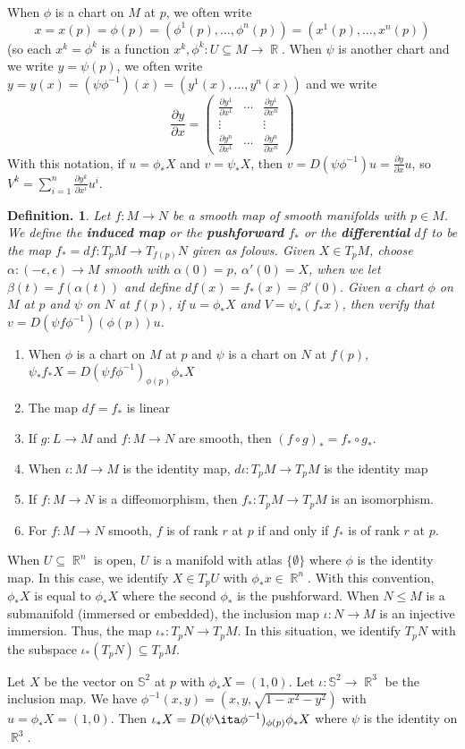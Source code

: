 \documentclass[11pt, a4paper]{memoir}
\DeclareMathOperator{\R}{{\mathbb{R}}}
\theoremstyle{change}
\theoremstyle{plain}
\theoremstyle{nonumberplain}
\newtheorem{definition}{Definition.}
\newcommand{\prt}[2]{\ensuremath{\frac{\partial #1}{\partial #2}}}
\numberwithin{equation}{section}
\begin{document}
When $\phi$ is a chart on $M$ at $p$, we often write
\begin{equation*}
    x=x(p)=\phi(p)=(\phi^1(p),\ldots,\phi^n(p))=(x^1(p),\ldots,x^n(p))
\end{equation*}
(so each $x^k=\phi^k$ is a function $x^k,\phi^k:U\subseteq M\to\R$.
When $\psi$ is another chart and we write $y=\psi(p)$, we often write $y=y(x)=(\psi\phi^{-1})(x)=(y^1(x),\ldots,y^n(x))$ and we write
\begin{equation*}
    \prt{y}{x}=
    \begin{pmatrix}
        \prt{y^1}{x^1} & \cdots & \prt{y^1}{x^n}\\
        \vdots &&\vdots\\
        \prt{y^n}{x^1} & \cdots & \prt{y^n}{x^n}
    \end{pmatrix}
\end{equation*}
With this notation, if $u=\phi_*X$ and $v=\psi_*X$, then $v=D(\psi\phi^{-1})u=\prt{y}{x}u$, so $V^k=\sum_{i=1}^n\prt{y^k}{x^i}u^i$.
\begin{definition}
    Let $f:M\to N$ be a smooth map of smooth manifolds with $p\in M$.
    We define the \textbf{induced map} or the \textbf{pushforward} $f_*$ or the \textbf{differential} $df$ to be the map $f_*=df:T_pM\to T_{f(p)}N$ given as folows.
    Given $X\in T_pM$, choose $\alpha:(-\epsilon,\epsilon)\to M$ smooth with $\alpha(0)=p$, $\alpha'(0)=X$, when we let $\beta(t)=f(\alpha(t))$ and define $df(x)=f_*(x)=\beta'(0)$.
    Given a chart $\phi$ on $M$ at $p$ and $\psi$ on $N$ at $f(p)$, if $u=\phi_*X$ and $V=\psi_*(f_*x)$, then verify that $v=D(\psi f\phi^{-1})(\phi(p))u$.
\end{definition}
\begin{enumerate}[nl]
    \item When $\phi$ is a chart on $M$ at $p$ and $\psi$ is a chart on $N$ at $f(p)$, $\psi_*f_*X=D(\psi f\phi^{-1})_{\phi(p)}\phi_*X$
    \item The map $df=f_*$ is linear
    \item If $g:L\to M$ and $f:M\to N$ are smooth, then $(f\circ g)_*=f_*\circ g_*$.
    \item When $\iota:M\to M$ is the identity map, $d\iota:T_pM\to T_pM$ is the identity map
    \item If $f:M\to N$ is a diffeomorphism, then $f_*:T_pM\to T_pM$ is an isomorphism.
    \item For $f:M\to N$ smooth, $f$ is of rank $r$ at $p$ if and only if $f_*$ is of rank $r$ at $p$.
\end{enumerate}
When $U\subseteq\R^n$ is open, $U$ is a manifold with atlas $\{\emptyset\}$ where $\phi$ is the identity map.
In this case, we identify $X\in T_pU$ with $\phi_*x\in\R^n$.
With this convention, $\phi_*X$ is equal to $\phi_*X$ where the second $\phi_*$ is the pushforward.
When $N\leq M$ is a submanifold (immersed or embedded), the inclusion map $\iota:N\to M$ is an injective immersion.
Thus, the map $\iota_*:T_pN\to T_pM$.
In this situation, we identify $T_pN$ with the subspace $\iota_*(T_pN)\subseteq T_pM$.

Let $X$ be the vector on $\mathbb{S}^2$ at $p$ with $\phi_*X=(1,0)$.
Let $\iota:\mathbb{S}^2\to\R^3$ be the inclusion map.
We have $\phi^{-1}(x,y)=(x,y,\sqrt{1-x^2-y^2})$ with $u=\phi_*X=(1,0)$.
Then $\iota_*X=D(\psi\ita\phi^{-1})_{\phi(p)}\phi_*X$ where $\psi$ is the identity on $\R^3$.
\end{document}
